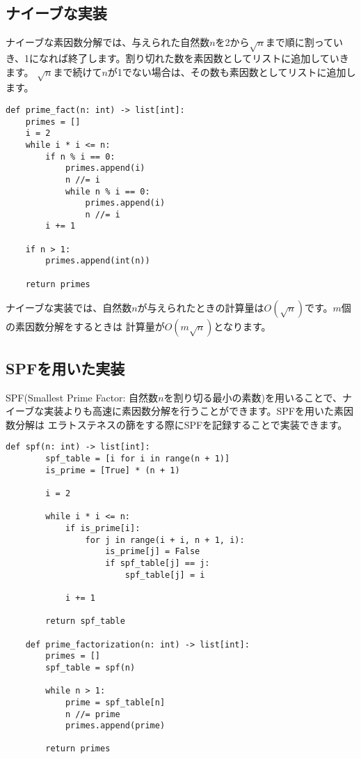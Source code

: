 \documentclass{jlreq}
\begin{document}
\subsection{ナイーブな実装}

ナイーブな素因数分解では、与えられた自然数$n$を2から$\sqrt{n}$まで順に割っていき、1になれば終了します。割り切れた数を素因数としてリストに追加していきます。
$\sqrt{n}$まで続けて$n$が1でない場合は、その数も素因数としてリストに追加します。

\begin{lstlisting}[caption=ナイーブな素因数分解の実装の実装, label=factor, frame=TRBL]
def prime_fact(n: int) -> list[int]:
    primes = []
    i = 2
    while i * i <= n:
        if n % i == 0:
            primes.append(i)
            n //= i
            while n % i == 0:
                primes.append(i)
                n //= i
        i += 1

    if n > 1:
        primes.append(int(n))

    return primes
\end{lstlisting}

ナイーブな実装では、自然数$n$が与えられたときの計算量は$O(\sqrt{n})$です。$m$個の素因数分解をするときは
計算量が$O(m \sqrt{n})$となります。 

\subsection{SPFを用いた実装}

SPF(Smallest Prime Factor: 自然数$n$を割り切る最小の素数)を用いることで、ナイーブな実装よりも高速に素因数分解を行うことができます。SPFを用いた素因数分解は
エラトステネスの篩をする際にSPFを記録することで実装できます。

\begin{lstlisting}[caption=SPFを用いた素因数分解の実装, label=spf, frame=TRBL]
def spf(n: int) -> list[int]:
        spf_table = [i for i in range(n + 1)]
        is_prime = [True] * (n + 1)
        
        i = 2
        
        while i * i <= n:
            if is_prime[i]:
                for j in range(i + i, n + 1, i):
                    is_prime[j] = False
                    if spf_table[j] == j:
                        spf_table[j] = i
            
            i += 1
            
        return spf_table 
    
    def prime_factorization(n: int) -> list[int]:
        primes = []
        spf_table = spf(n)
        
        while n > 1:
            prime = spf_table[n]
            n //= prime
            primes.append(prime)
        
        return primes
\end{lstlisting}
\end{document}
